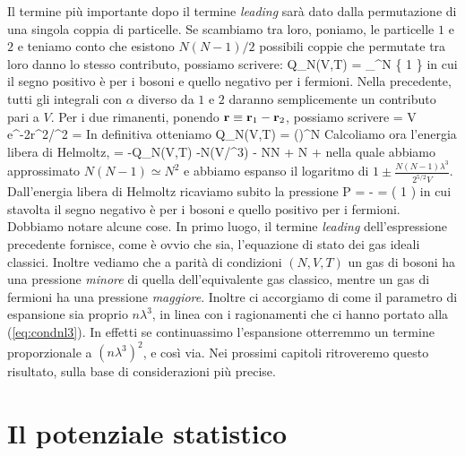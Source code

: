 Il termine più importante dopo il termine {\em leading} sarà dato dalla permutazione di una singola coppia di particelle. Se scambiamo tra loro, poniamo, le particelle $1$ e $2$ e teniamo conto che esistono $N(N-1)/2$ possibili coppie che permutate tra loro danno lo stesso contributo, possiamo scrivere:
\be
Q_N(V,T) =  \int \prod_{}^{N}
\left\{
1 \pm {}\exp{}
\right\}
\ee
in cui il segno positivo è per i bosoni e quello negativo per i fermioni. Nella precedente, tutti gli integrali con $\alpha$ diverso da $1$ e $2$ daranno semplicemente un contributo pari a $V$. Per i due rimanenti, ponendo $\mathbf{r}\equiv\mathbf{r}_1-\mathbf{r}_2$, possiamo scrivere
\be
\int{} \exp{}
= V\int{}\; e^{-2\pi r^2/\lambda^2} = 
\ee
In definitiva otteniamo
\be
Q_N(V,T) = \left(\right)^N
\ee
Calcoliamo ora l'energia libera di Helmoltz,
\be
\label{eq:Aapprox}
 = -\ln Q_N(V,T) \simeq -N\ln(V/\lambda^3) - N\ln N + N \mp {}
+ \cdots
\ee
nella quale abbiamo approssimato $N(N-1)\simeq N^2$ e abbiamo espanso il logaritmo di
$1 \pm \frac{N(N-1)\lambda^3}{2^{5/2}V}$. Dall'energia libera di Helmoltz ricaviamo subito la pressione
\be
P = - = \left(
1 \mp {}
\right)
\ee
in cui stavolta il segno negativo è per i bosoni e quello positivo per i fermioni. Dobbiamo notare alcune cose. In primo luogo, il termine {\em leading} dell'espressione precedente fornisce, come è ovvio che sia, l'equazione di stato dei gas ideali classici. Inoltre vediamo che a parità di condizioni $(N,V,T)$ un gas di bosoni ha una pressione {\em minore} di quella dell'equivalente gas classico, mentre un gas di fermioni ha una pressione {\em maggiore}. Inoltre ci accorgiamo di come il parametro di espansione sia proprio $n\lambda^3$, in linea con i ragionamenti che ci hanno portato alla (\ref{eq:condnl3}). In effetti se continuassimo l'espansione otterremmo un termine proporzionale a $(n\lambda^3)^2$, e così via. Nei prossimi capitoli ritroveremo questo risultato, sulla base di considerazioni più precise.

\section{Il potenziale statistico}

